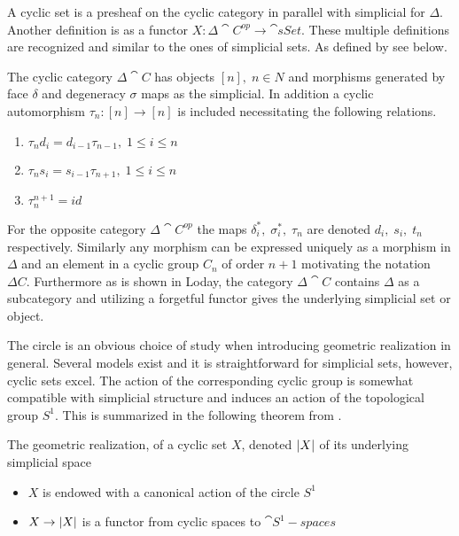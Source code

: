 \documentclass[../../main.tex]{subfiles}
\begin{document}
    A cyclic set is a presheaf on the cyclic category in parallel with  simplicial for $\Delta$. Another definition is as a functor $X:\Delta \cat{C^{op}} \to \cat{sSet}$. These multiple definitions are recognized and similar to the ones of simplicial sets. As defined by \cite{loday-cyclic} see below.
    
    \begin{definition}
        The cyclic category $\Delta \cat{C}$ has objects $[n], \;n\in N$ and morphisms generated by face $\delta$ and degeneracy $\sigma$ maps as the simplicial. In addition a cyclic automorphism $\tau_n:[n]\to [n]$ is included necessitating the following relations.
        \begin{enumerate}
            \item $\tau _n d_i = d_{i-1}\tau_{n-1},\; 1 \leq i\leq n$
            \item $\tau _n s_i = s_{i-1}\tau_{n+1},\; 1 \leq i\leq n$
            \item $\tau_{n}^{n+1}=id$
        \end{enumerate}
    \end{definition}

    For the opposite category $\Delta \cat{C^{op}}$ the maps $\delta_i^*, \; \sigma_i^*,\;\tau_n$ are denoted $d_i,\; s_i, \; t_n$ respectively. Similarly any morphism can be expressed uniquely as a morphism in $\Delta$ and an element in a cyclic group $C_n$ of order $n+1$ motivating the notation $\Delta C$. Furthermore as is shown in Loday, the category $\Delta \cat{C}$ contains $\Delta$ as a subcategory and utilizing a forgetful functor gives the underlying simplicial set or object. 

    The circle is an obvious choice of study when introducing geometric realization in general. Several models exist and it is straightforward for simplicial sets, however, cyclic sets excel. The action of the corresponding cyclic group is somewhat compatible with simplicial structure and induces an action of the topological group $S^1$. This is summarized in the following theorem from \cite{loday-cyclic}.

    \begin{theorem}\label{hardstuff}
        The geometric realization, of a cyclic set $X$, denoted $\geom[X]$ of its underlying simplicial space
        \begin{itemize}
            \item $X$ is endowed with a canonical action of the circle $S^1$
            \item $X \to \geom[X]$ is a functor from cyclic spaces to $\cat{S^1-spaces}$
        \end{itemize}
    \end{theorem} %
\end{document}
